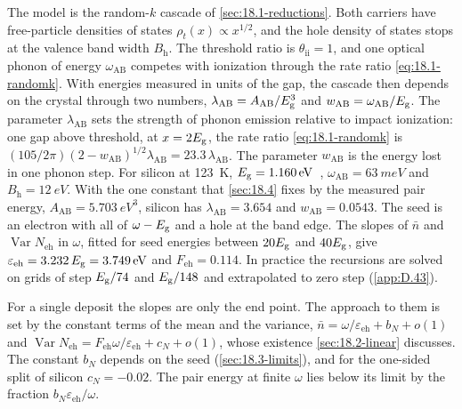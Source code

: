 The model is the random-$k$ cascade of \cref{sec:18.1-reductions}. Both carriers have free-particle densities of states $\rho_t(x) \propto x^{1/2}$, and the hole density of states stops at the valence band width $B_{\mathrm{h}}$. The threshold ratio is $\theta_{\mathrm{ii}} = 1$, and one optical phonon of energy $\omega_{\mathrm{AB}}$ competes with ionization through the rate ratio \cref{eq:18.1-randomk}. With energies measured in units of the gap, the cascade then depends on the crystal through two numbers, $\lambda_{\mathrm{AB}} = A_{\mathrm{AB}}/E_{\mathrm{g}}^3$ and $w_{\mathrm{AB}} = \omega_{\mathrm{AB}}/E_{\mathrm{g}}$. The parameter $\lambda_{\mathrm{AB}}$ sets the strength of phonon emission relative to impact ionization: one gap above threshold, at $x = 2E_{\mathrm{g}}$, the rate ratio \cref{eq:18.1-randomk} is $(105/2\pi)(2 - w_{\mathrm{AB}})^{1/2}\lambda_{\mathrm{AB}} = 23.3\,\lambda_{\mathrm{AB}}$. The parameter $w_{\mathrm{AB}}$ is the energy lost in one phonon step. For silicon at \SI{123}{K}, $E_{\mathrm{g}} = \SI{1.160}{eV}$~\cite[Eq.~(11)]{ramanathan2020ionization}, $\omega_{\mathrm{AB}} = \SI{63}{meV}$ and $B_{\mathrm{h}} = \SI{12}{eV}$. With the one constant that \cref{sec:18.4} fixes by the measured pair energy, $A_{\mathrm{AB}} = \SI{5.703}{eV^3}$, silicon has $\lambda_{\mathrm{AB}} = 3.654$ and $w_{\mathrm{AB}} = 0.0543$. The seed is an electron with all of $\omega - E_{\mathrm{g}}$ and a hole at the band edge. The slopes of $\bar n$ and $\operatorname{Var}N_{\mathrm{eh}}$ in $\omega$, fitted for seed energies between $20E_{\mathrm{g}}$ and $40E_{\mathrm{g}}$, give $\varepsilon_{\mathrm{eh}} = 3.232\,E_{\mathrm{g}} = \SI{3.749}{eV}$ and $F_{\mathrm{eh}} = 0.114$. In practice the recursions are solved on grids of step $E_{\mathrm{g}}/74$ and $E_{\mathrm{g}}/148$ and extrapolated to zero step (\cref{app:D.43}).

For a single deposit the slopes are only the end point. The approach to them is set by the constant terms of the mean and the variance, $\bar n = \omega/\varepsilon_{\mathrm{eh}} + b_N + o(1)$ and $\operatorname{Var}N_{\mathrm{eh}} = F_{\mathrm{eh}}\omega/\varepsilon_{\mathrm{eh}} + c_N + o(1)$, whose existence \cref{sec:18.2-linear} discusses. The constant $b_N$ depends on the seed (\cref{sec:18.3-limits}), and for the one-sided split of silicon $c_N = -0.02$. The pair energy at finite $\omega$ lies below its limit by the fraction $b_N\varepsilon_{\mathrm{eh}}/\omega$.

